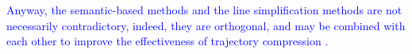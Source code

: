 \textcolor{blue}{Anyway, the semantic-based methods and the line simplification methods are not necessarily contradictory, indeed, they are orthogonal, and may be combined with each other to improve the effectiveness of trajectory compression \cite{Lin:Cised}.}



